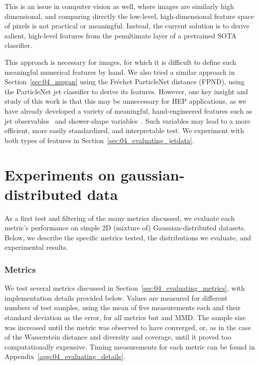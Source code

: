 This is an issue in computer vision as well, where images are similarly high dimensional, and comparing directly the low-level, high-dimensional feature space of pixels is not practical or meaningful.
Instead, the current solution is to derive salient, high-level features from the penultimate layer of a pretrained SOTA classifier.

This approach is necessary for images, for which it is difficult to define such meaningful numerical features by hand.
We also tried a similar approach in Section~\ref{sec:04_mpgan} using the Fr\'echet ParticleNet distance (FPND), using the ParticleNet jet classifier to derive its features.
However, one key insight and study of this work is that this may be unnecessary for HEP applications, as we have already developed a variety of meaningful, hand-engineered features such as jet observables~\cite{marzani_jets, larkoski2020jet, Komiske:2017aww} and shower-shape variables~\cite{baffioni_electronrecocms, atlas_photonrecoatlas}.
Such variables may lead to a more efficient, more easily standardized, and interpretable test.
We experiment with both types of features in Section~\ref{sec:04_evaluating_jetdata}.

\section{Experiments on gaussian-distributed data}
\label{sec:04_evaluating_toydata}

As a first test and filtering of the many metrics discussed, we evaluate each metric's performance on simple 2D (mixture of) Gaussian-distributed datasets.
Below, we describe the specific metrics tested, the distributions we evaluate, and experimental results.


\subsubsection{Metrics}
\label{sec:04_evaluating_toydata_metrics}

We test several metrics discussed in Section~\ref{sec:04_evaluating_metrics}, with implementation details provided below.
Values are measured for different numbers of test samples, using the mean of five measurements each and their standard deviation as the error, for all metrics but \fgdinf and MMD.
The sample size was increased until the metric was observed to have converged, or, as in the case of the Wasserstein distance and diversity and coverage, until it proved too computationally expensive.
Timing measurements for each metric can be found in Appendix~\ref{app:04_evaluating_details}.


